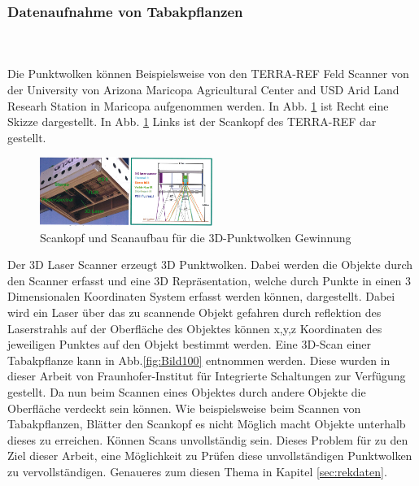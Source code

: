 \documentclass{llncs}
\begin{document}
\subsubsection{Datenaufnahme von Tabakpflanzen}
~\\\\
Die Punktwolken können Beispielsweise von den TERRA-REF Feld Scanner von der University von Arizona Maricopa Agricultural Center and USD Arid Land Researh Station in Maricopa aufgenommen werden. In Abb. \ref{fig:Bild9} ist  Recht eine Skizze dargestellt. In Abb. \ref{fig:Bild9} Links ist der Scankopf des TERRA-REF dar gestellt.
\begin{figure}[htbp] 
	\centering
	\includegraphics[width=0.5\textwidth]{lematech_2.png}
	\caption{Scankopf und Scanaufbau für die 3D-Punktwolken Gewinnung}
	\label{fig:Bild9}
\end{figure}
Der 3D Laser Scanner erzeugt 3D Punktwolken. Dabei werden die Objekte durch den Scanner erfasst und eine 3D Repräsentation, welche durch Punkte in einen 3 Dimensionalen Koordinaten System erfasst werden können, dargestellt. Dabei wird ein Laser über das zu scannende Objekt gefahren durch reflektion des Laserstrahls auf der Oberfläche des Objektes können x,y,z Koordinaten des jeweiligen Punktes auf den Objekt bestimmt werden. Eine 3D-Scan einer Tabakpflanze kann in Abb.\ref{fig:Bild100} entnommen werden. Diese wurden in dieser Arbeit von Fraunhofer-Institut für Integrierte Schaltungen zur Verfügung gestellt. Da nun beim Scannen eines Objektes durch andere Objekte die Oberfläche verdeckt sein können. Wie beispielsweise beim Scannen von Tabakpflanzen, Blätter den Scankopf es nicht Möglich macht Objekte unterhalb dieses zu erreichen. Können Scans unvollständig sein. Dieses Problem für zu den Ziel dieser Arbeit, eine Möglichkeit zu Prüfen diese unvollständigen Punktwolken zu vervollständigen. Genaueres zum diesen Thema in Kapitel \ref{sec:rekdaten}. 
\end{document}
